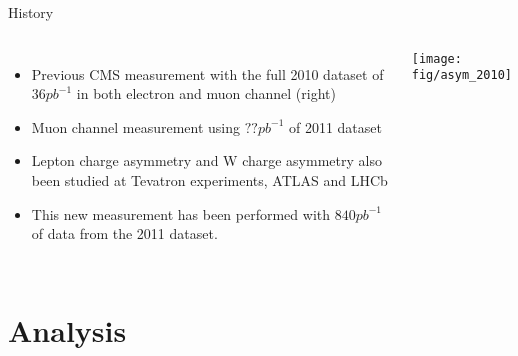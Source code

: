 \documentclass[t, 8pt]{beamer}
\begin{document}
\begin{frame}{History}
  \begin{columns}[c]
  \begin{itemize}
    \item Previous CMS measurement with the full 2010 dataset of $36 pb^{-1}$ in both electron and muon channel (right)
    \item Muon channel measurement using $??pb^{-1}$ of 2011 dataset
    \item Lepton charge asymmetry and W charge asymmetry also been studied at Tevatron experiments, ATLAS and LHCb
    \vspace{1cm}
    \item This new measurement has been performed with $840pb^{-1}$ of data from the 2011 dataset.
  \end{itemize}
    \texttt{[image: fig/asym\_2010]}
  \end{columns}
\end{frame}






\section{Analysis}
\end{document}
